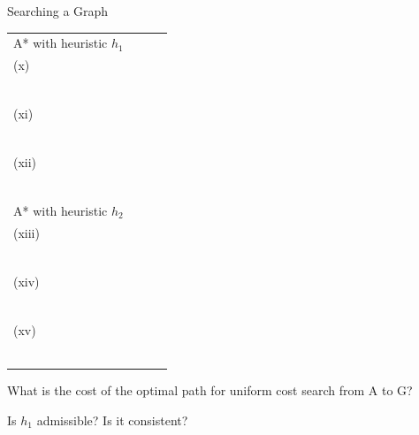 \begin{problem}{Searching a Graph}
\begin{question}[15]
\begin{table}[h]
\begin{center}
\begin{tabular}{|l|l|l|l|}
\hline
A* with heuristic $h_1$ & \begin{minipage}{3cm}~\\(x)\quad\solution{}{\Threeax}~\\~\\\end{minipage} &
\begin{minipage}{3cm}~\\(xi)\quad\solution{}{\Threeaxi}~\\~\\\end{minipage} & 
\begin{minipage}{3cm}~\\(xii)\quad\solution{}{\Threeaxii}~\\~\\\end{minipage}\\
\hline
A* with heuristic $h_2$ & \begin{minipage}{3cm}~\\(xiii)\quad\solution{}{\Threeaxiii}~\\~\\\end{minipage} &
\begin{minipage}{3cm}~\\(xiv)\quad\solution{}{\Threeaxiv}~\\~\\\end{minipage} & 
\begin{minipage}{3cm}~\\(xv)\quad\solution{}{\Threeaxv}~\\~\\\end{minipage}\\
\hline
\end{tabular}
\end{center}
\end{table}
  
\end{question}

\begin{question}[1]
What is the cost of the optimal path for uniform cost search from A to G?


\end{question}

\begin{question}[4]
Is $h_1$ admissible? Is it consistent?


\end{question}
\end{problem}
